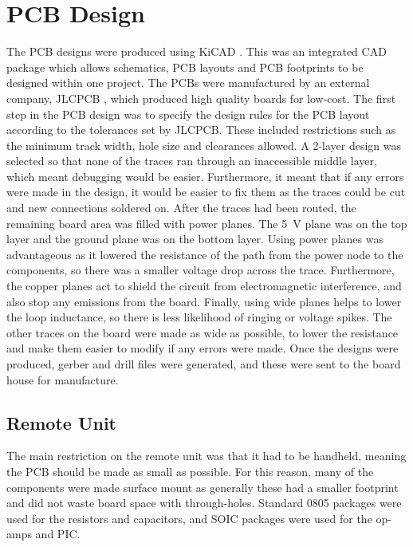 \section{PCB Design}
The PCB designs were produced using KiCAD \cite{kicad}. This was an integrated CAD package which allows schematics, PCB layouts and PCB footprints to be designed within one project. The PCBs were manufactured by an external company, JLCPCB \cite{pcb_house}, which produced high quality boards for low-cost. The first step in the PCB design was to specify the design rules for the PCB layout according to the tolerances set by JLCPCB. These included restrictions such as the minimum track width, hole size and clearances allowed. A 2-layer design was selected so that none of the traces ran through an inaccessible middle layer, which meant debugging would be easier. Furthermore, it meant that if any errors were made in the design, it would be easier to fix them as the traces could be cut and new connections soldered on. After the traces had been routed, the remaining board area was filled with power planes. The \SI{+5}{\volt} plane was on the top layer and the ground plane was on the bottom layer. Using power planes was advantageous as it lowered the resistance of the path from the power node to the components, so there was a smaller voltage drop across the trace. Furthermore, the copper planes act to shield the circuit from electromagnetic interference, and also stop any emissions from the board. Finally, using wide planes helps to lower the loop inductance, so there is less likelihood of ringing or voltage spikes. The other traces on the board were made as wide as possible, to lower the resistance and make them easier to modify if any errors were made. Once the designs were produced, gerber and drill files were generated, and these were sent to the board house for manufacture.\\


\subsection{Remote Unit}
The main restriction on the remote unit was that it had to be handheld, meaning the PCB should be made as small as possible. For this reason, many of the components were made surface mount as generally these had a smaller footprint and did not waste board space with through-holes. Standard 0805 packages were used for the resistors and capacitors, and SOIC packages were used for the op-amps and PIC.\\

